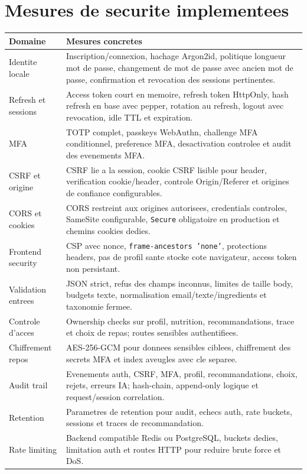 \documentclass[10pt,a4paper]{article}
\begin{document}
\section{Mesures de securite implementees}
\begin{tabularx}{\textwidth}{@{}L{3.8cm}Y@{}}
\toprule
\textbf{Domaine} & \textbf{Mesures concretes} \\
\midrule
Identite locale & Inscription/connexion, hachage Argon2id, politique longueur mot de passe, changement de mot de passe avec ancien mot de passe, confirmation et revocation des sessions pertinentes. \\
Refresh et sessions & Access token court en memoire, refresh token HttpOnly, hash refresh en base avec pepper, rotation au refresh, logout avec revocation, idle TTL et expiration. \\
MFA & TOTP complet, passkeys WebAuthn, challenge MFA conditionnel, preference MFA, desactivation controlee et audit des evenements MFA. \\
CSRF et origine & CSRF lie a la session, cookie CSRF lisible pour header, verification cookie/header, controle Origin/Referer et origines de confiance configurables. \\
CORS et cookies & CORS restreint aux origines autorisees, credentials controles, SameSite configurable, \texttt{Secure} obligatoire en production et chemins cookies dedies. \\
Frontend security & CSP avec nonce, \texttt{frame-ancestors 'none'}, protections headers, pas de profil sante stocke cote navigateur, access token non persistant. \\
Validation entrees & JSON strict, refus des champs inconnus, limites de taille body, budgets texte, normalisation email/texte/ingredients et taxonomie fermee. \\
Controle d'acces & Ownership checks sur profil, nutrition, recommandations, trace et choix de repas; routes sensibles authentifiees. \\
Chiffrement repos & AES-256-GCM pour donnees sensibles ciblees, chiffrement des secrets MFA et index aveugles avec cle separee. \\
Audit trail & Evenements auth, CSRF, MFA, profil, recommandations, choix, rejets, erreurs IA; hash-chain, append-only logique et request/session correlation. \\
Retention & Parametres de retention pour audit, echecs auth, rate buckets, sessions et traces de recommandation. \\
Rate limiting & Backend compatible Redis ou PostgreSQL, buckets dedies, limitation auth et routes HTTP pour reduire brute force et DoS. \\

\end{tabularx}
\end{document}
